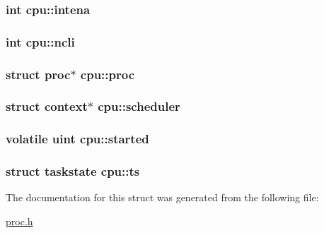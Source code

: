 \subsubsection[{\texorpdfstring{intena}{intena}}]{\setlength{\rightskip}{0pt plus 5cm}int cpu\+::intena}\hypertarget{structcpu_a26fc271fea8af30d67fc2ae22ef0a82f}{}\label{structcpu_a26fc271fea8af30d67fc2ae22ef0a82f}
\subsubsection[{\texorpdfstring{ncli}{ncli}}]{\setlength{\rightskip}{0pt plus 5cm}int cpu\+::ncli}\hypertarget{structcpu_a9ccad8ae031c295f86e96de26df24805}{}\label{structcpu_a9ccad8ae031c295f86e96de26df24805}
\subsubsection[{\texorpdfstring{proc}{proc}}]{\setlength{\rightskip}{0pt plus 5cm}struct {\bf proc}$\ast$ cpu\+::proc}\hypertarget{structcpu_a9e71a6265904fd644875a9ea5a413c89}{}\label{structcpu_a9e71a6265904fd644875a9ea5a413c89}
\subsubsection[{\texorpdfstring{scheduler}{scheduler}}]{\setlength{\rightskip}{0pt plus 5cm}struct {\bf context}$\ast$ cpu\+::scheduler}\hypertarget{structcpu_aaa1510fdf8a2230c033d04e13e4fdd9e}{}\label{structcpu_aaa1510fdf8a2230c033d04e13e4fdd9e}
\subsubsection[{\texorpdfstring{started}{started}}]{\setlength{\rightskip}{0pt plus 5cm}volatile {\bf uint} cpu\+::started}\hypertarget{structcpu_a869f6e0e1dbf69de0bdb3546f981847f}{}\label{structcpu_a869f6e0e1dbf69de0bdb3546f981847f}
\subsubsection[{\texorpdfstring{ts}{ts}}]{\setlength{\rightskip}{0pt plus 5cm}struct {\bf taskstate} cpu\+::ts}\hypertarget{structcpu_a32e7b5aa877171c943d47038e818a159}{}\label{structcpu_a32e7b5aa877171c943d47038e818a159}


The documentation for this struct was generated from the following file\+:\begin{DoxyCompactItemize}
\item 
\hyperlink{proc_8h}{proc.\+h}\end{DoxyCompactItemize}
